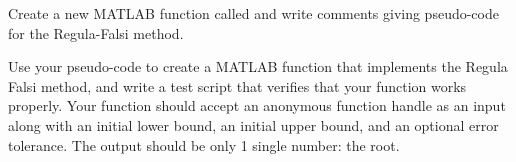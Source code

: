 \begin{problem}
    Create a new MATLAB function called  and write comments giving pseudo-code
    for the Regula-Falsi method.
\end{problem}

\begin{problem}
   Use your pseudo-code to create a MATLAB function that implements the Regula Falsi method, and write a test script
   that verifies that your function works properly. Your function should accept an
    anonymous function handle as an input along with an initial lower bound, an initial
    upper bound, and an optional error tolerance. The output should be only 1 single number: the
    root.\\
\end{problem}



